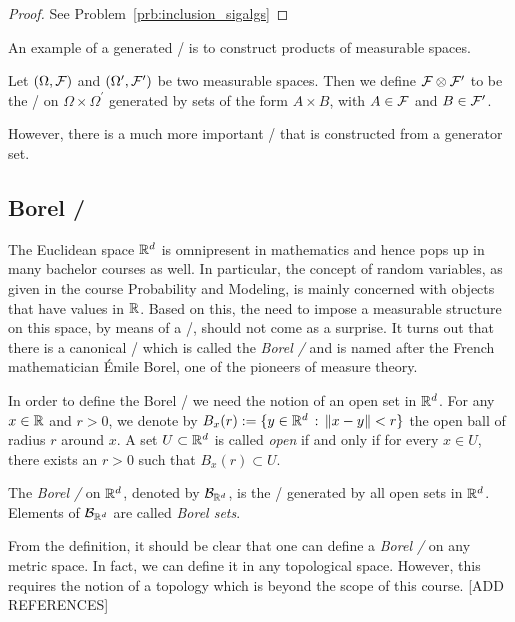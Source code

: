 \begin{proof}
See Problem~\ref{prb:inclusion_sigalgs}
\end{proof}

An example of a generated \sigalg/ is to construct products of measurable spaces.

\begin{definition}\label{def:product_sigalg}
Let $(\Omega, \mathcal F)$ and $(\Omega^\prime, \mathcal F^\prime)$ be two measurable spaces. Then we define $\mathcal F \otimes \mathcal F^\prime$ to be the \sigalg/ on $\Omega \times \Omega^\prime$ generated by sets of the form $A \times B$, with $A \in \mathcal F$ and $B \in \mathcal F^\prime$.
\end{definition}

However, there is a much more important \sigalg/ that is constructed from a generator set.

\subsection{Borel \sigalg/}

The Euclidean space $\mathbb R^d$ is omnipresent in mathematics and hence pops up in many bachelor courses as well. In particular, the concept of random variables, as given in the course Probability and Modeling, is mainly concerned with objects that have values in $\mathbb R$. Based on this, the need to impose a measurable structure on this space, by means of a \sigalg/, should not come as a surprise. It turns out that there is a canonical \sigalg/ which is called the \emph{Borel \sigalg/} and is named after the French mathematician \'{E}mile Borel, one of the pioneers of measure theory.

In order to define the Borel \sigalg/ we need the notion of an open set in $\mathbb R^d$. For any $x \in \mathbb R$ and $r >0$, we denote by $B_x(r) := \{y \in \mathbb R^d \, : \, \|x-y\|<r\}$ the open ball of radius $r$ around $x$. A set $U \subset \mathbb R^d$ is called \emph{open} if and only if for every $x \in U$, there exists an $r > 0$ such that $B_x(r) \subset U$.

\begin{definition}
The \emph{Borel \sigalg/} on $\mathbb R^d$, denoted by $\mathcal B_{\mathbb R^d}$, is the \sigalg/ generated by all open sets in $\mathbb R^d$. Elements of $\mathcal B_{\mathbb R^d}$ are called \emph{Borel sets}.
\end{definition}

\begin{remark}
From the definition, it should be clear that one can define a \emph{Borel \sigalg/} on any metric space. In fact, we can define it in any topological space. However, this requires the notion of a topology which is beyond the scope of this course. [ADD REFERENCES]
\end{remark}

